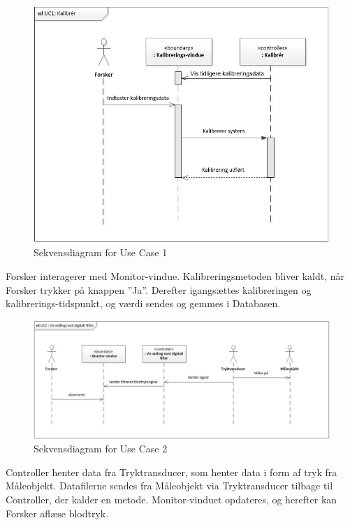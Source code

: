 \begin{figure}[H]
	\centering
	\includegraphics[width=1\textwidth]{Figurer/UC1_SD}
	\caption{Sekvensdiagram for Use Case 1}
\end{figure}

Forsker interagerer med Monitor-vindue. Kalibreringsmetoden bliver kaldt, når Forsker trykker på knappen ”Ja”. Derefter igangsættes kalibreringen og kalibrerings-tidspunkt, og værdi sendes og gemmes i Databasen. 

\begin{figure}[H]
	\centering
	\includegraphics[width=1\textwidth]{Figurer/UC2_SD}
	\caption{Sekvensdiagram for Use Case 2}
\end{figure}

Controller henter data fra Tryktransducer, som henter data i form af tryk fra Måleobjekt. Datafilerne sendes fra Måleobjekt via Tryktransducer tilbage til Controller, der kalder en metode. Monitor-vinduet opdateres, og herefter kan Forsker aflæse blodtryk. 


